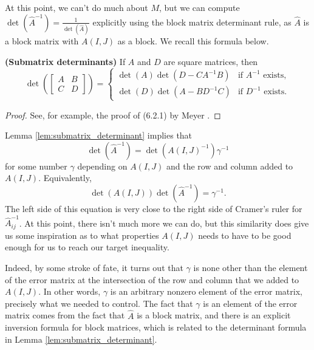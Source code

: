 \documentclass{article}
\begin{document}
	At this point, we can't do much about $M$, but we can compute $\det\left(\widehat{A}^{-1}\right) = \frac{1}{\det\left(\widehat{A}\right)}$ explicitly using the block matrix determinant rule, as $\widehat{A}$ is a block matrix with $A(I,J)$ as a block. We recall this formula below.
	
	\begin{lem} \textnormal{\bf(Submatrix determinants)}
		\label{lem:submatrix_determinant}
		If $A$ and $D$ are square matrices, then
		\begin{equation}
			\det\left(\left[\begin{matrix}A & B \\ C & D\end{matrix}\right]\right) = \begin{cases}
				\det(A)\det(D-CA^{-1}B) & \text{if $A^{-1}$ exists}, \\
				\det(D)\det(A-BD^{-1}C) & \text{if $D^{-1}$ exists}.
			\end{cases}
		\end{equation}
	\end{lem}
	
	\begin{proof}
		See, for example, the proof of (6.2.1) by Meyer \cite{meyer_2008}.
	\end{proof}
	
	Lemma \ref{lem:submatrix_determinant} implies that
	\begin{equation}
		\det\left(\widehat{A}^{-1}\right) = \det\left(A(I,J)^{-1}\right)\gamma^{-1}
	\end{equation}
	for some number $\gamma$ depending on $A(I,J)$ and the row and column added to $A(I,J)$. Equivalently,
	\begin{equation}
		\det(A(I,J))\det\left(\widehat{A}^{-1}\right) = \gamma^{-1}.
	\end{equation}
	The left side of this equation is very close to the right side of Cramer's ruler for $\widehat{A}^{-1}_{ij}$. At this point, there isn't much more we can do, but this similarity does give us some inspiration as to what properties $A(I,J)$ needs to have to be good enough for us to reach our target inequality.
	
	Indeed, by some stroke of fate, it turns out that $\gamma$ is none other than the element of the error matrix at the intersection of the row and column that we added to $A(I,J)$. In other words, $\gamma$ is an arbitrary nonzero element of the error matrix, precisely what we needed to control. The fact that $\gamma$ is an element of the error matrix comes from the fact that $\widehat{A}$ is a block matrix, and there is an explicit inversion formula for block matrices, which is related to the determinant formula in Lemma \ref{lem:submatrix_determinant}.
	
\end{document}
